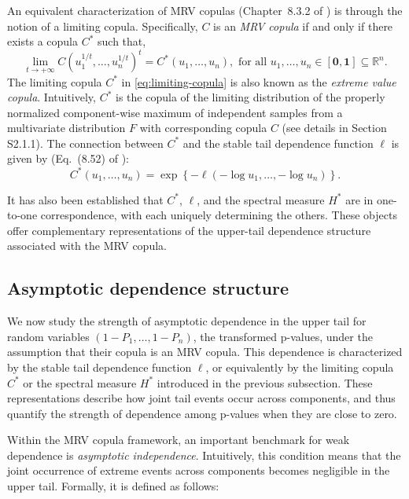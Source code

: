 \documentclass[12pt]{article}
\theoremstyle{plain}
\theoremstyle{plain}
\theoremstyle{definition}
\newcommand{\R}{\mathbb{R}}
\begin{document}
An equivalent characterization of MRV copulas (Chapter~8.3.2 of \cite{beirlant2006statistics}) %
is through the notion of a limiting copula. Specifically, $C$ is an \emph{MRV copula} if and only if there exists a copula $C^*$ such that,  
\begin{equation}
\label{eq:limiting-copula}
    \lim_{t\to+\infty}C(u_1^{1/t},\dots,u_n^{1/t})^t=C^*(u_1,\dots,u_n), \mbox{~for all $u_1,\dots,u_n\in [\mathbf0,\mathbf1]\subseteq\R^n$.}
\end{equation}
    The limiting copula $C^*$ in \eqref{eq:limiting-copula} is also known as the \emph{extreme value copula}. Intuitively, $C^*$ is the copula of the limiting distribution of the properly normalized component-wise maximum
of independent samples from a multivariate distribution $F$ with corresponding copula $C$ (see details in Section S2.1.1). The connection between $C^*$ and the stable tail dependence function $\ell$ is given by (Eq.~(8.52) of \cite{beirlant2006statistics}):
\begin{equation}
\label{eq:c-star-and-l}
    C^*(u_1,\dots, u_n)=\exp{\left\{-\ell\left(-\log u_1,\dots, -\log u_n\right)\right\}}.
\end{equation}
    
It has also been established that $C^*$, $\ell$, and the spectral measure $H^*$ are in one-to-one correspondence, with each uniquely determining the others. These objects offer complementary representations of the upper-tail dependence structure associated with the MRV copula.
    

\subsection{Asymptotic dependence structure}
\label{subsec:asymptotic-dependence}

We now study the strength of asymptotic dependence in the upper tail for random variables $(1 - P_1, \dots, 1 - P_n)$, the transformed p-values, under the assumption that their copula is an MRV copula. This dependence is characterized by the stable tail dependence function $\ell$, or equivalently by the limiting copula $C^*$ or the spectral measure $H^*$ introduced in the previous subsection. These representations describe how joint tail events occur across components, and thus quantify the strength of dependence among p-values when they are close to zero.



Within the MRV copula framework, an important benchmark for weak dependence is \emph{asymptotic independence}. Intuitively, this condition means that the joint occurrence of extreme events across components becomes negligible in the upper tail. Formally, it is defined as follows:
\end{document}
